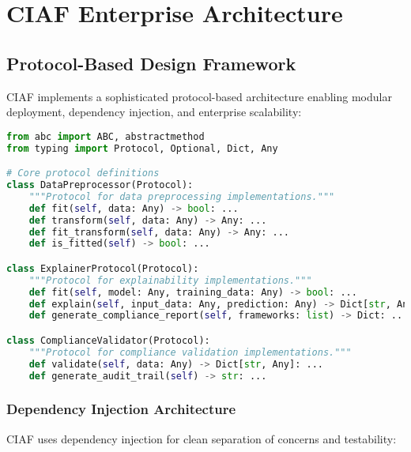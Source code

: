 \documentclass[12pt,a4paper]{article}
\begin{document}
\section{CIAF Enterprise Architecture}

\subsection{Protocol-Based Design Framework}

CIAF implements a sophisticated protocol-based architecture enabling modular deployment, dependency injection, and enterprise scalability:

\begin{lstlisting}[language=Python, caption=Protocol-Based Architecture Foundation]
from abc import ABC, abstractmethod
from typing import Protocol, Optional, Dict, Any

# Core protocol definitions
class DataPreprocessor(Protocol):
    """Protocol for data preprocessing implementations."""
    def fit(self, data: Any) -> bool: ...
    def transform(self, data: Any) -> Any: ...
    def fit_transform(self, data: Any) -> Any: ...
    def is_fitted(self) -> bool: ...

class ExplainerProtocol(Protocol):
    """Protocol for explainability implementations."""
    def fit(self, model: Any, training_data: Any) -> bool: ...
    def explain(self, input_data: Any, prediction: Any) -> Dict[str, Any]: ...
    def generate_compliance_report(self, frameworks: list) -> Dict: ...

class ComplianceValidator(Protocol):
    """Protocol for compliance validation implementations."""
    def validate(self, data: Any) -> Dict[str, Any]: ...
    def generate_audit_trail(self) -> str: ...
\end{lstlisting}

\subsubsection{Dependency Injection Architecture}

CIAF uses dependency injection for clean separation of concerns and testability:
\end{document}

